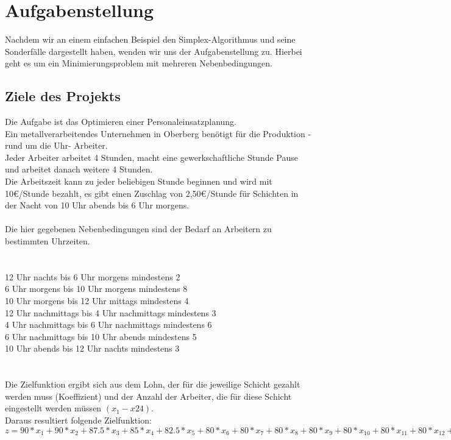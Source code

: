 \section{Aufgabenstellung}
Nachdem wir an einem einfachen Beispiel den Simplex-Algorithmus und seine Sonderfälle dargestellt haben, wenden wir uns der Aufgabenstellung zu.
Hierbei geht es um ein Minimierungsproblem mit mehreren Nebenbedingungen. 
\subsection{Ziele des Projekts}
Die Aufgabe ist das Optimieren einer Personaleinsatzplanung.\\
Ein metallverarbeitendes Unternehmen in Oberberg benötigt für die Produktion -rund um die Uhr- Arbeiter.\\
Jeder Arbeiter arbeitet 4 Stunden, macht eine gewerkschaftliche Stunde Pause und arbeitet danach weitere 4 Stunden.\\
Die Arbeitszeit kann zu jeder beliebigen Stunde beginnen und wird mit 10€/Stunde bezahlt, es gibt einen Zuschlag von 2,50€/Stunde für Schichten in der Nacht von 10 Uhr abends bis 6 Uhr morgens.\\
\\
Die hier gegebenen Nebenbedingungen sind der Bedarf an Arbeitern zu bestimmten Uhrzeiten.\\
\\\\
12 Uhr nachts bis 6 Uhr morgens mindestens 2\\
6 Uhr morgens bis 10 Uhr morgens mindestens 8\\
10 Uhr morgens bis 12 Uhr mittags mindestens 4\\
12 Uhr nachmittags bis 4 Uhr nachmittags mindestens 3\\
4 Uhr nachmittags bis 6 Uhr nachmittags mindestens 6\\
6 Uhr nachmittags bis 10 Uhr abends mindestens 5\\
10 Uhr abends bis 12 Uhr nachts mindestens 3\\
\\\\
Die Zielfunktion ergibt sich aus dem Lohn, der für die jeweilige Schicht gezahlt werden muss (Koeffizient) und der Anzahl der Arbeiter, die für diese Schicht eingestellt werden müssen $(x_1-x{24})$.\\
Daraus resultiert folgende Zielfunktion: $z = 90*x_1 + 90*x_2 + 87.5*x_3 + 85*x_4 + 82.5*x_5 + 80*x_6 + 80*x_7 + 80*x_8 + 80*x_9 + 80*x_{10} + 80*x_{11} + 80*x_{12} + 80*x_{13} + 82.5*x_{14} + 85*x_{15} + 87.5*x_{16} + 90*x_{17} + 90*x_{18} + 92.5*x_{19} + 95*x_{20} + 97.5*x_{21} + 97.5*x_{22} + 95*x_{23} + 92.5*x_{24}$